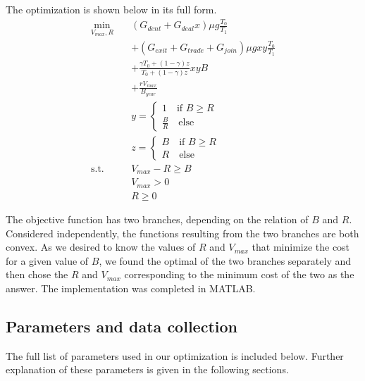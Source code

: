 \documentclass[conference]{IEEEtran}
\begin{document}
The optimization is shown below in its full form. 
\begin{equation}
    \begin{split}
        \min_{V_{max}, R} \quad &(G_{dent} + G_{deal} x) \mu g \frac{T_0}{T_1} \\  
        &+(G_{exit} + G_{trade} + G_{join}) \mu g x y \frac{T_0}{T_1} \\
        &+\frac{\gamma T_0 + (1-\gamma)z}{T_0 + (1-\gamma)z} x y B\\
        &+\frac{r V_{max}}{B_{year}} \\
         &y = 
        \begin{cases}
            1              \quad \text{if } B\geq R\\
            \frac{B}{R}    \quad \text{else}
        \end{cases}
        \\
        &z = 
        \begin{cases}
            B       \quad \text{if } B\geq R\\
            R       \quad \text{else}
        \end{cases} \\
        \text{s.t.} \quad &V_{max} - R \geq B \\
        &V_{max} > 0 \\
        & R \geq 0
    \end{split}
\end{equation}

The objective function has two branches, depending on the relation of $B$ and $R$. Considered independently, the functions resulting from the two branches are both convex. As we desired to know the values of $R$ and $V_{max}$ that minimize the cost for a given value of $B$, we found the optimal of the two branches separately and then chose the $R$ and $V_{max}$ corresponding to the minimum cost of the two as the answer. The implementation was completed in MATLAB.

\subsection{Parameters and data collection}
\label{sec:params}
The full list of parameters used in our optimization is included below. Further explanation of these parameters is given in the following sections.
\end{document}
